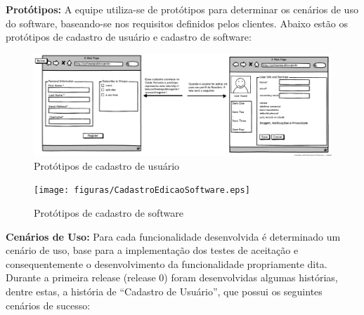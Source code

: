 \textbf{Protótipos: }
	A equipe utiliza-se de protótipos para determinar os cenários de uso do software, baseando-se nos requisitos definidos pelos clientes. Abaixo estão os protótipos de cadastro de usuário e cadastro de software:

	\begin{figure}[h!]
    	\centering
    	\includegraphics[keepaspectratio=true,scale=0.32]
      		{figuras/CadastroEdicaoUser.eps}
    	\caption{Protótipos de cadastro de usuário}
    	\label{cadastro user}
	\end{figure}

	\begin{figure}[h!]
    	\centering
    	\texttt{[image: figuras/CadastroEdicaoSoftware.eps]}
    	\caption{Protótipos de cadastro de software}
    	\label{cadastro software}
	\end{figure}

\newpage

\textbf{Cenários de Uso: }
	Para cada funcionalidade desenvolvida é determinado um cenário de uso, base para a implementação dos testes de aceitação e consequentemente o desenvolvimento da funcionalidade propriamente dita.
	Durante a primeira release (release 0) foram desenvolvidas algumas histórias, dentre estas, a história de ``Cadastro de Usuário'', que possui os seguintes cenários de sucesso:

